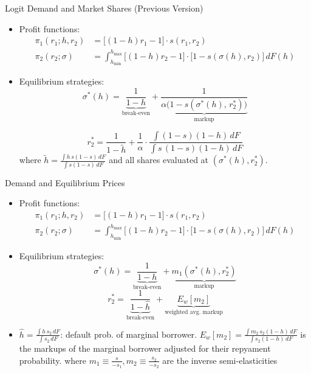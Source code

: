\documentclass[10pt,aspectratio=169]{beamer}
\begin{document}
\begin{frame}{Logit Demand and Market Shares (Previous Version)}
\begin{itemize}
\item Profit functions:
\begin{align*}
    \pi_1(r_1; h, r_2) &= \big[(1-h)r_1 - 1\big] \cdot s(r_1, r_2) \\
    \pi_2(r_2; \sigma) &= \int_{h_{\min}}^{h_{\max}} \big[(1-h)r_2 - 1\big] \cdot \big[1 - s(\sigma(h), r_2)\big] \, dF(h) 
\end{align*}

\item Equilibrium strategies:
$$\sigma^*(h) = \underbrace{\frac{1}{1-h}}_{\text{break-even}} + \underbrace{\frac{1}{\alpha\big(1-s(\sigma^*(h),\, r_2^*)\big)}}_{\text{markup}}$$

$$r_2^* = \frac{1}{1 - \tilde{h}} + \frac{1}{\alpha}\cdot\frac{\displaystyle\int (1-s)(1-h)\, dF}{\displaystyle\int s\,(1-s)(1-h)\, dF}$$
where $\tilde{h} = \frac{\int h\, s(1-s)\, dF}{\int s(1-s)\, dF}$ and all shares evaluated at $(\sigma^*(h), r_2^*)$.
\end{itemize}
\end{frame}


\begin{frame}{Demand and Equilibrium Prices}
\begin{itemize}
\item Profit functions:
\begin{align*}
    \pi_1(r_1; h, r_2) &= \big[(1-h)r_1 - 1\big] \cdot s(r_1, r_2) \\
    \pi_2(r_2; \sigma) &= \int_{h_{\min}}^{h_{\max}} \big[(1-h)r_2 - 1\big] \cdot \big[1 - s(\sigma(h), r_2)\big] \, dF(h) 
\end{align*}

\item Equilibrium strategies: 
$$\sigma^*(h) = \underbrace{\frac{1}{1-h}}_{\text{break-even}} + \underbrace{m_1(\sigma^*(h), r_2^*)}_{\text{markup}}$$
$$r_2^* = \underbrace{\frac{1}{1-\hat{h}}}_{\text{break-even}} + \underbrace{E_w[m_2]}_{\text{weighted avg.\ markup}}$$
\item $\hat{h} = \frac{\int h\, s_2\, dF}{\int s_2\, dF}$: default prob. of marginal borrower. \quad $E_w[m_2] = \frac{\int m_2\, s_2(1-h)\, dF}{\int s_2(1-h)\, dF}$
is the markups of the marginal borrower adjusted for their repyament probability.
where  $m_1 \equiv \frac{s}{-s_1}, m_2 \equiv \frac{s_2}{-s_2}$ are the inverse semi-elasticities

\end{itemize}
\end{frame}
\end{document}

